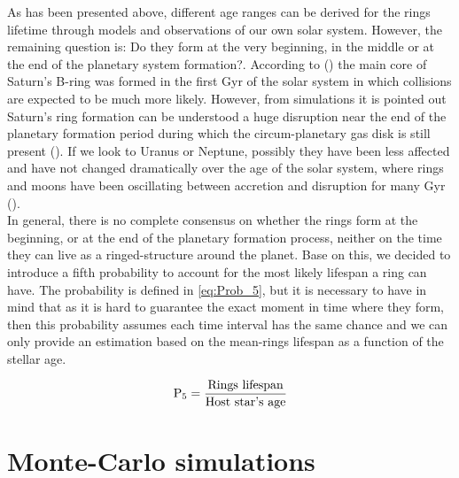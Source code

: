 As has been presented above, different age ranges can be derived for the rings lifetime through models and observations of our own solar system. However, the remaining question is: Do they form at the very beginning, in the middle or at the end of the planetary system formation?. According to  (\citeyear{2009Icar..199..413C}) the main core of Saturn's B-ring was formed in the first Gyr of the solar system in which collisions are expected to be much more likely. However, from simulations it is pointed out Saturn's ring formation can be understood a huge disruption near the end of the planetary formation period during which the circum-planetary gas disk is still present  (\citeyear{2010Natur.468..943C}). If we look to Uranus or Neptune, possibly they have been less affected and have not changed dramatically over the age of the solar system, where rings and moons have been oscillating between accretion and disruption for many Gyr  (\citeyear{2013pss3.book..309T}).\\

In general, there is no complete consensus on whether the rings form at the beginning, or at the end of the planetary formation process, neither on the time they can live as a ringed-structure around the planet. Base on this, we decided to introduce a fifth probability to account for the most likely lifespan a ring can have. The probability is defined in \autoref{eq:Prob_5}, but it is necessary to have in mind that as it is hard to guarantee the exact moment in time where they form, then this probability assumes each time interval has the same chance and we can only provide an estimation based on the mean-rings lifespan as a function of the stellar age.  

\begingroup
\Large
\begin{equation}
\textnormal{P}_5 = \frac{\textnormal{Rings}~\textnormal{lifespan}}{\textnormal{Host}~\textnormal{star's}~\textnormal{age}}
 \label{eq:Prob_5}
\end{equation}
\endgroup


\section{Monte-Carlo simulations} \label{sec:MCSec}

